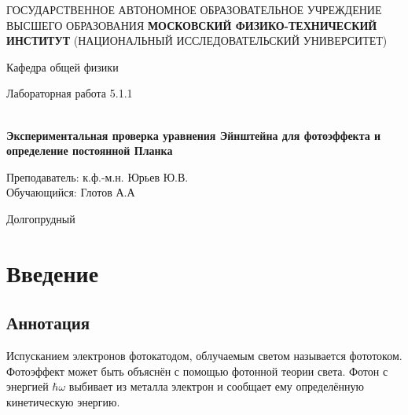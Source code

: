 \documentclass[12pt,a4paper]{article}
\author{Глотов Алексей}
\begin{document}
\newpage
\begin{center}
\footnotesize{{ГОСУДАРСТВЕННОЕ АВТОНОМНОЕ ОБРАЗОВАТЕЛЬНОЕ УЧРЕЖДЕНИЕ}\break
{ВЫСШЕГО ОБРАЗОВАНИЯ}
\break
{\bf {МОСКОВСКИЙ ФИЗИКО-ТЕХНИЧЕСКИЙ ИНСТИТУТ}}
\break
\small{(НАЦИОНАЛЬНЫЙ ИССЛЕДОВАТЕЛЬСКИЙ УНИВЕРСИТЕТ)}}
\break
\hfill \break
\hfill \break
\begin{center}
\normalsize{Кафедра общей физики}
\end{center}
\hfill \break
\hfill \break
\hfill \break
\hfill \break

\begin{center}
\normalsize {Лабораторная работа 5.1.1}
\end{center}
\hfill \break\\
\large{\textbf{Экспериментальная проверка уравнения Эйнштейна для фотоэффекта и определение постоянной Планка}}
\end{center}
\begin{flushleft}
\hfill \break
\hfill \break
\hfill \break
\hfill \break
\hfill \break
\hfill \break
\hfill \break
\hfill \break
\hfill \break
\hfill \break
\hangindent=10cm
\normalsize{Преподаватель:} \;\;\;\;
\normalsize{к.ф.-м.н. Юрьев Ю.В.}\\
\hfill \break
\normalsize{Обучающийся:} \;\;\;\;\;
\normalsize{Глотов А.А} \\
\hfill \break
\end{flushleft}
\hfill \break
\hfill \break
\hfill \break
\hfill \break
\hfill \break
\hfill \break
\hfill \break
\hfill \break
\hfill \break
\hfill \break
\hfill \break

\begin{center}
Долгопрудный 
\end{center}

\thispagestyle{empty}


\newpage
\section{Введение}

\subsection{Аннотация}

Испусканием электронов фотокатодом, облучаемым светом называется фототоком. Фотоэффект может быть объяснён с помощью фотонной теории света. Фотон с энергией $\hbar \omega$ выбивает из металла электрон и сообщает ему определённую кинетическую энергию. 
\end{document}
